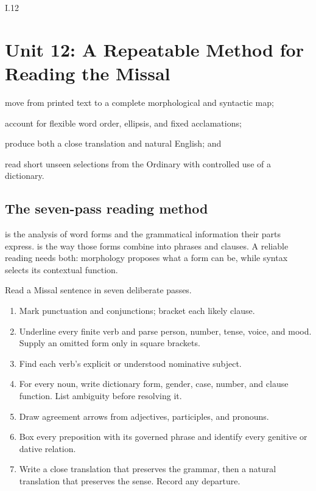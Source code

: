 \begin{courseunit}{I.12}
\chapter{Unit 12: A Repeatable Method for Reading the Missal}

\begin{learningobjectives}
  \item move from printed text to a complete morphological and syntactic map;
  \item account for flexible word order, ellipsis, and fixed acclamations;
  \item produce both a close translation and natural English; and
  \item read short unseen selections from the Ordinary with controlled use of
        a dictionary.
\end{learningobjectives}

\section{The seven-pass reading method}

 is the analysis of word forms and the grammatical information
their parts express.  is the way those forms combine into phrases
and clauses. A reliable reading needs both: morphology proposes what a form can
be, while syntax selects its contextual function.

Read a Missal sentence in seven deliberate passes.
\begin{enumerate}
  \item Mark punctuation and conjunctions; bracket each likely clause.
  \item Underline every finite verb and parse person, number, tense, voice,
        and mood. Supply an omitted form only in square brackets.
  \item Find each verb's explicit or understood nominative subject.
  \item For every noun, write dictionary form, gender, case, number, and
        clause function. List ambiguity before resolving it.
  \item Draw agreement arrows from adjectives, participles, and pronouns.
  \item Box every preposition with its governed phrase and identify every
        genitive or dative relation.
  \item Write a close translation that preserves the grammar, then a natural
        translation that preserves the sense. Record any departure.
\end{enumerate}


\end{courseunit}
